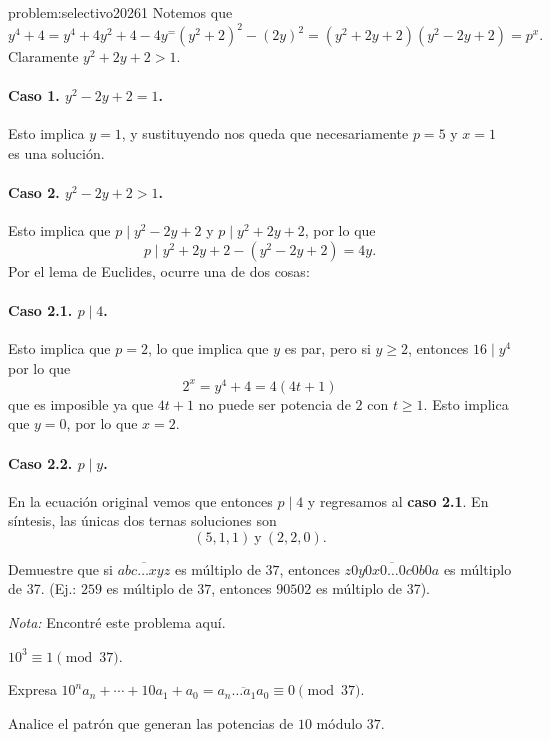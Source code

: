 \begin{solutiontoproblem}{problem:selectivo20261}
	Notemos que
	\[y^4 + 4 = y^4 + 4y^2 + 4 - 4y^ = (y^2 + 2)^2 - (2y)^2 = (y^2 + 2y + 2)(y^2 - 2y + 2) = p^x.\]
	Claramente $y^2 + 2y + 2 > 1$.
	\paragraph{Caso 1. $y^2 - 2y + 2 = 1$.}
	Esto implica $y = 1$, y sustituyendo nos queda que necesariamente $p = 5$ y $x = 1$
	es una solución.
	\paragraph{Caso 2. $y^2 - 2y + 2 > 1$. }
	Esto implica que $p \mid y^2 - 2y + 2$ y $p \mid y^2 + 2y + 2$,
	por lo que
	\[p \mid y^2 + 2y + 2 - (y^2 - 2y + 2) = 4y.\]
	Por el lema de Euclides, ocurre una de dos cosas:
	\paragraph{Caso 2.1. $p \mid 4$. } Esto implica
	que $p = 2$, lo que implica que $y$ es par,
	pero si $y \geq 2$, entonces $16 \mid y^4$
	por lo que
	\[2^x = y^4 + 4 = 4(4t + 1)\]
	que es imposible ya que $4t + 1$ no puede
	ser potencia de $2$ con $t \geq 1$.
	Esto implica que $y = 0$, por lo que $x = 2$.

	\paragraph{Caso 2.2. $p \mid y$. } En la ecuación original
	vemos que entonces $p \mid 4$ y regresamos al \textbf{caso 2.1}.
	En síntesis, las únicas dos ternas soluciones son
	\[(5, 1, 1) \  \text{y} \  (2, 2, 0).\]
\end{solutiontoproblem}

\begin{problem}[CAM JT 2025]
Demuestre que si $\overline{abc\dots{x}yz}$ es múltiplo de $37$,
entonces $\overline{z0y0x0\dots0c0b0a}$ es múltiplo de 37.
(Ej.: $259$ es múltiplo de $37$, entonces $90502$ es múltiplo de 37).

\textit{Nota: } Encontré este problema aquí.
\begin{hints}
	\begin{hint}
		$10^3 \equiv 1 \pmod {37}$.
	\end{hint}
	\begin{hint}
		Expresa $10^na_n + \cdots + 10a_1 + a_0 = \overline{a_n\dots a_1a_0} \equiv 0 \pmod{37}$.
	\end{hint}
	\begin{hint}
		Analice el patrón que generan las potencias
		de $10$ módulo $37$.
	\end{hint}
\end{hints}
\end{problem}

